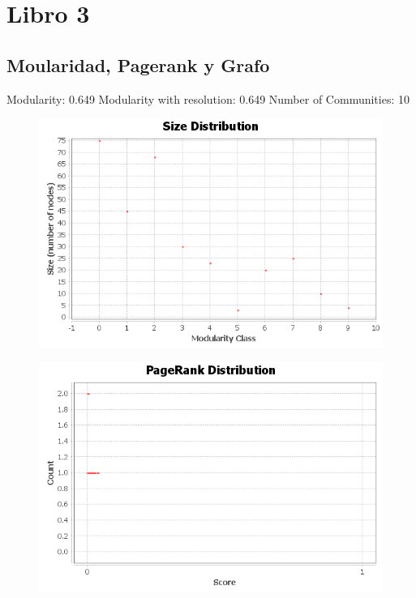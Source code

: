 \documentclass[]{article}
\begin{document}
\section{Libro 3}\label{libro-3}

\subsection{Moularidad, Pagerank y
Grafo}\label{moularidad-pagerank-y-grafo-2}

Modularity: 0.649 Modularity with resolution: 0.649 Number of
Communities: 10

\begin{figure}[htbp]  
\centering
\includegraphics{modb3/communities-size-distribution.png}
\end{figure}

\begin{figure}[htbp]  
\centering
\includegraphics{prb3/pageranks.png}
\end{figure}
\end{document}

